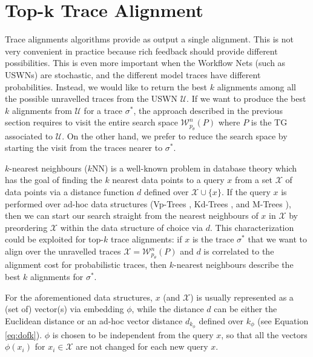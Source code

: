 \section{Top-k Trace Alignment}\label{sec:topk}
Trace alignments algorithms provide as output a single alignment. This is not very convenient in practice because rich feedback should provide different possibilities. This is even more important when the Workflow Nets (such as USWNs) are stochastic, and the different model traces have different probabilities. {Instead, we would like to return the best $k$ alignments among all the possible unravelled traces from the USWN $\mathcal{U}$. If we want to produce the best $k$ alignments from $\mathcal{U}$ for a trace $\sigma^*$, the approach described in the previous section requires to visit the entire search space $\mathcal{W}_{p_\theta}^n(P)$ where $P$ is the TG associated to $\mathcal{U}$. On the other hand, we prefer to reduce the search space by starting the visit from the traces nearer to $\sigma^*$.}



$k$-nearest neighbours ($k$NN) is a well-known problem in database theory \cite{Altman} which has the goal of finding the $k$ nearest data points to a query $x$ from a set $\mathcal{X}$ of data points via a distance function $d$ defined over $\mathcal{X}\cup\{x\}$. {If the query  $x$ is performed over ad-hoc data structures (Vp-Trees \cite{Fu2000}, Kd-Trees \cite{Maneewongvatana99}, and M-Trees \cite{Ciaccia}), then we can start our search straight from the nearest neighbours of $x$ in $\mathcal{X}$ by preordering  $\mathcal{X}$ within the data structure of choice via $d$. This characterization could be exploited for top-$k$ trace alignments: if $x$ is the trace $\sigma^*$ that we want to align over the unravelled traces $\mathcal{X}=\mathcal{W}^n_{p_\theta}(P)$ and $d$ is correlated to the alignment cost for probabilistic traces, then $k$-nearest neighbours describe the best $k$ alignments for  $\sigma^*$.}
	
{For the aforementioned data structures, 
$x$ (and $\mathcal{X}$) is usually represented as a (set of) vector(s) via embedding  $\phi$, while the distance $d$ can be either the Euclidean distance or an ad-hoc vector distance $d_{k_\phi}$ defined over $k_\phi$ (see Equation \ref{eq:dofk}). $\phi$ is chosen to be independent from the query $x$, so that all the vectors $\phi(x_i)$ for $x_i\in\mathcal{X}$ are not changed for each new query $x$.}

